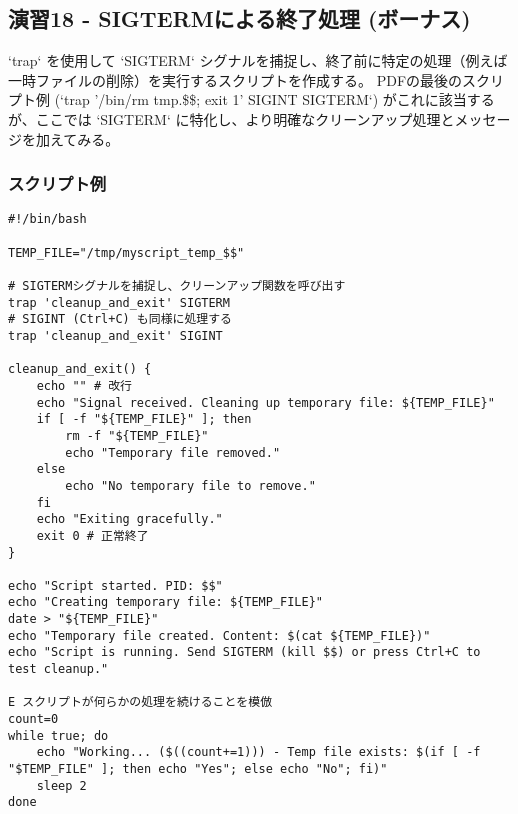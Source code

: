\documentclass[a4paper,11pt]{jsarticle}
\begin{document}
\subsection*{演習18 - SIGTERMによる終了処理 (ボーナス)}
`trap` を使用して `SIGTERM` シグナルを捕捉し、終了前に特定の処理（例えば一時ファイルの削除）を実行するスクリプトを作成する。
PDFの最後のスクリプト例 (`trap '/bin/rm tmp.\$\$; exit 1' SIGINT SIGTERM`) がこれに該当するが、ここでは `SIGTERM` に特化し、より明確なクリーンアップ処理とメッセージを加えてみる。

\subsubsection*{スクリプト例}
\begin{lstlisting}[caption=演習18 SIGTERMによる終了処理スクリプト]
#!/bin/bash

TEMP_FILE="/tmp/myscript_temp_$$"

# SIGTERMシグナルを捕捉し、クリーンアップ関数を呼び出す
trap 'cleanup_and_exit' SIGTERM
# SIGINT (Ctrl+C) も同様に処理する
trap 'cleanup_and_exit' SIGINT

cleanup_and_exit() {
    echo "" # 改行
    echo "Signal received. Cleaning up temporary file: ${TEMP_FILE}"
    if [ -f "${TEMP_FILE}" ]; then
        rm -f "${TEMP_FILE}"
        echo "Temporary file removed."
    else
        echo "No temporary file to remove."
    fi
    echo "Exiting gracefully."
    exit 0 # 正常終了
}

echo "Script started. PID: $$"
echo "Creating temporary file: ${TEMP_FILE}"
date > "${TEMP_FILE}"
echo "Temporary file created. Content: $(cat ${TEMP_FILE})"
echo "Script is running. Send SIGTERM (kill $$) or press Ctrl+C to test cleanup."

E スクリプトが何らかの処理を続けることを模倣
count=0
while true; do
    echo "Working... ($((count+=1))) - Temp file exists: $(if [ -f "$TEMP_FILE" ]; then echo "Yes"; else echo "No"; fi)"
    sleep 2
done
\end{lstlisting}
\end{document}
